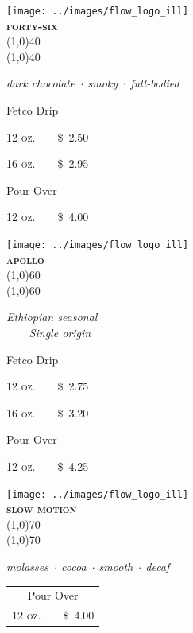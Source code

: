 \documentclass[letterpaper, 12pt]{article}%
\newcommand{\ill}{
\texttt{[image: ../images/flow\_logo\_ill]}
}
\newcommand{\menuentry}[2]{
 \emph{\footnotesize#1}\\
 \vspace*{\fill}
 {\small#2}
}
\newcommand{\menuitem}[4]{
 \centering
  \ill\\
  \smallskip\vspace{0.1em}
  \textbf{\sffamily \textsc{\large#2}}\vspace{-1ex}\\
  \line(1,0){#1}\vspace{-2ex}\\
  \line(1,0){#1}\vspace{0.5ex}\\
  \smallskip
  \menuentry{#3}{#4}
}
\newcommand{\flowtherefore}{~~\raisebox{0.2ex}{$\therefore$}~~}
\newcommand{\price}[2]{
 \textsc{\small#1}\flowtherefore\$~\textsc{\small#2}
}
\begin{document}
{\centering
 \begin{minipage}[t][0.26\textwidth][b]{0.3\textwidth}
  \centering
  \menuitem{40}{
   forty-six}{
   dark chocolate~$\cdot$ smoky~$\cdot$ full-bodied}{
   Fetco Drip
   
   \price{12 oz.}{2.50}
   
   \price{16 oz.}{2.95}   
   
   Pour Over
   
   \price{12 oz.}{4.00}
  }
 \end{minipage} 
 \begin{minipage}[t][0.26\textwidth][b]{0.3\textwidth}
  \centering
  \menuitem{60}{
   apollo}{
   Ethiopian seasonal \\
   \flowtherefore Single origin \flowtherefore 
   }{
   Fetco Drip
   
   \price{12 oz.}{2.75}
   
   \price{16 oz.}{3.20}
   
   Pour Over
   
   \price{12 oz.}{4.25}
  } 
 \end{minipage} 
 \begin{minipage}[t][0.22\textwidth][b]{0.3\textwidth}
  \centering
  \menuitem{70}{
   slow motion}{
   molasses~$\cdot$ cocoa~$\cdot$ smooth~$\cdot$ decaf}{
   \begin{tabular}{@{} c @{}}
   Pour Over\\
   \price{12 oz.}{4.00}\\
   \end{tabular}
   
   \rule{0pt}{1.1em}
  }
 \end{minipage} 
 
}

\rule{0pt}{0pt}
\end{document}
